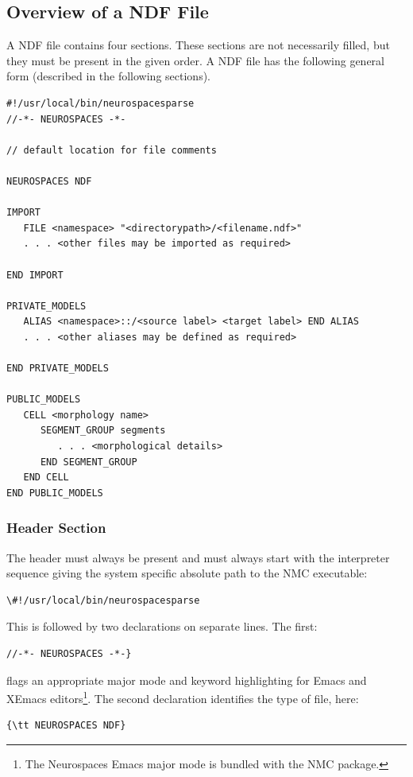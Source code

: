 \documentclass[12pt]{article}
\begin{document}
\subsection{Overview of a NDF File}
\label{sec:overview-ndf-file}

A NDF file contains four sections. These sections are not necessarily
filled, but they must be present in the given order.  A NDF file has
the following general form (described in the following sections).

\begin{center}
  \begin{minipage}{13cm}
\begin{verbatim}
#!/usr/local/bin/neurospacesparse
//-*- NEUROSPACES -*-

// default location for file comments

NEUROSPACES NDF

IMPORT
   FILE <namespace> "<directorypath>/<filename.ndf>"
   . . . <other files may be imported as required>

END IMPORT

PRIVATE_MODELS
   ALIAS <namespace>::/<source label> <target label> END ALIAS
   . . . <other aliases may be defined as required>

END PRIVATE_MODELS

PUBLIC_MODELS
   CELL <morphology name>
      SEGMENT_GROUP segments
         . . . <morphological details>
      END SEGMENT_GROUP
   END CELL
END PUBLIC_MODELS
\end{verbatim}
  \end{minipage}
\end{center}

\subsubsection{Header Section}

The header must always be present and must always start with the
interpreter sequence giving the system specific absolute path to the
NMC executable:

\begin{verbatim}
\#!/usr/local/bin/neurospacesparse
\end{verbatim}

This is followed by two declarations on separate lines. The first:
\begin{verbatim}
//-*- NEUROSPACES -*-}
\end{verbatim}
flags an appropriate major mode and keyword highlighting for Emacs and
XEmacs editors\footnote{The Neurospaces Emacs major mode is bundled
  with the NMC package.}. The second declaration identifies the type
of file, here:
\begin{verbatim}
{\tt NEUROSPACES NDF}
\end{verbatim}
\end{document}
